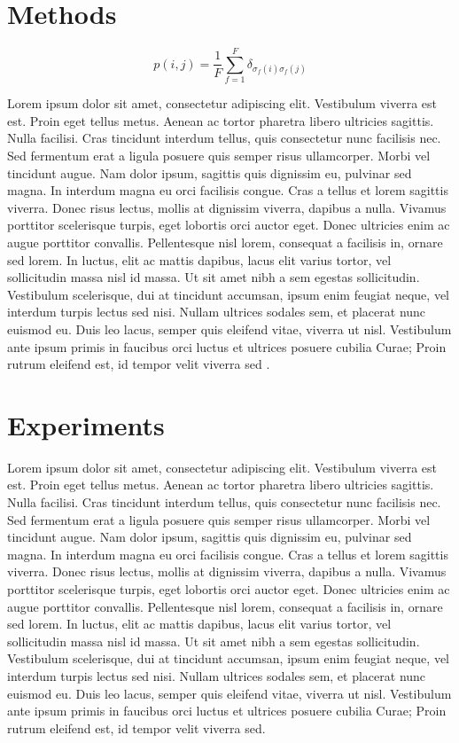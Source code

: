 \documentclass[graybox,natbib]{svmult}
\begin{document}
\section{Methods}\label{methods}

\begin{equation}\label{eq:axelrod}p(i,j) = \frac{1}{F} \sum_{f=1}^{F} \delta_{\sigma_f(i)\sigma_f(j)}\end{equation}

Lorem ipsum dolor sit amet, consectetur adipiscing elit. Vestibulum
viverra est est. Proin eget tellus metus. Aenean ac tortor pharetra
libero ultricies sagittis. Nulla facilisi. Cras tincidunt interdum
tellus, quis consectetur nunc facilisis nec. Sed fermentum erat a ligula
posuere quis semper risus ullamcorper. Morbi vel tincidunt augue. Nam
dolor ipsum, sagittis quis dignissim eu, pulvinar sed magna. In interdum
magna eu orci facilisis congue. Cras a tellus et lorem sagittis viverra.
Donec risus lectus, mollis at dignissim viverra, dapibus a nulla.
Vivamus porttitor scelerisque turpis, eget lobortis orci auctor eget.
Donec ultricies enim ac augue porttitor convallis. Pellentesque nisl
lorem, consequat a facilisis in, ornare sed lorem. In luctus, elit ac
mattis dapibus, lacus elit varius tortor, vel sollicitudin massa nisl id
massa. Ut sit amet nibh a sem egestas sollicitudin. Vestibulum
scelerisque, dui at tincidunt accumsan, ipsum enim feugiat neque, vel
interdum turpis lectus sed nisi. Nullam ultrices sodales sem, et
placerat nunc euismod eu. Duis leo lacus, semper quis eleifend vitae,
viverra ut nisl. Vestibulum ante ipsum primis in faucibus orci luctus et
ultrices posuere cubilia Curae; Proin rutrum eleifend est, id tempor
velit viverra sed \citep{mayr1959mayr}.

\section{Experiments}\label{experiments}

Lorem ipsum dolor sit amet, consectetur adipiscing elit. Vestibulum
viverra est est. Proin eget tellus metus. Aenean ac tortor pharetra
libero ultricies sagittis. Nulla facilisi. Cras tincidunt interdum
tellus, quis consectetur nunc facilisis nec. Sed fermentum erat a ligula
posuere quis semper risus ullamcorper. Morbi vel tincidunt augue. Nam
dolor ipsum, sagittis quis dignissim eu, pulvinar sed magna. In interdum
magna eu orci facilisis congue. Cras a tellus et lorem sagittis viverra.
Donec risus lectus, mollis at dignissim viverra, dapibus a nulla.
Vivamus porttitor scelerisque turpis, eget lobortis orci auctor eget.
Donec ultricies enim ac augue porttitor convallis. Pellentesque nisl
lorem, consequat a facilisis in, ornare sed lorem. In luctus, elit ac
mattis dapibus, lacus elit varius tortor, vel sollicitudin massa nisl id
massa. Ut sit amet nibh a sem egestas sollicitudin. Vestibulum
scelerisque, dui at tincidunt accumsan, ipsum enim feugiat neque, vel
interdum turpis lectus sed nisi. Nullam ultrices sodales sem, et
placerat nunc euismod eu. Duis leo lacus, semper quis eleifend vitae,
viverra ut nisl. Vestibulum ante ipsum primis in faucibus orci luctus et
ultrices posuere cubilia Curae; Proin rutrum eleifend est, id tempor
velit viverra sed.
\end{document}
